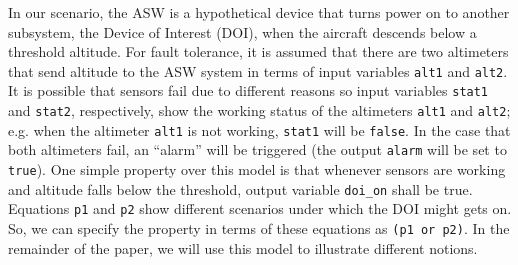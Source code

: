 In our scenario, the ASW is a hypothetical device that turns power on to another subsystem, the Device of Interest (DOI), when the aircraft descends below a threshold altitude.
For fault tolerance, it is assumed that there are two altimeters that send altitude to the ASW system in terms of input variables \texttt{alt1} and \texttt{alt2}.
It is possible that sensors fail due to different reasons so input variables \texttt{stat1} and \texttt{stat2}, respectively, show the working status of the altimeters \texttt{alt1} and \texttt{alt2}; e.g. when the altimeter \texttt{alt1} is not working, \texttt{stat1} will be \texttt{false}. In the case that both altimeters fail, an ``alarm'' will be triggered (the output \texttt{alarm} will be set to \texttt{true}).
One simple property over this model is that whenever sensors are working and altitude falls below the threshold, output variable \texttt{doi\_on} shall be true. Equations \texttt{p1} and \texttt{p2} show different scenarios under which the DOI might gets on. So, we can specify the property in terms of these equations as \texttt{(p1 or p2)}.
In the remainder of the paper, we will use this model to illustrate different notions.
